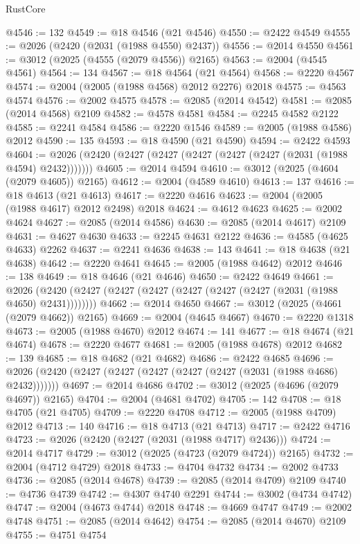\begin{lexlean}{RustCore}
\begin{coremodule}
@4546 := 132
@4549 := @18 @4546 (@21 @4546)
@4550 := @2422 @4549
@4555 := @2026 (@2420 (@2031 (@1988 @4550) @2437))
@4556 := @2014 @4550
@4561 := @3012 (@2025 (@4555 (@2079 @4556)) @2165)
@4563 := @2004 (@4545 @4561)
@4564 := 134
@4567 := @18 @4564 (@21 @4564)
@4568 := @2220 @4567
@4574 := @2004 (@2005 (@1988 @4568) @2012 @2276) @2018
@4575 := @4563 @4574
@4576 := @2002 @4575
@4578 := @2085 (@2014 @4542)
@4581 := @2085 (@2014 @4568) @2109
@4582 := @4578 @4581
@4584 := @2245 @4582 @2122
@4585 := @2241 @4584
@4586 := @2220 @1546
@4589 := @2005 (@1988 @4586) @2012
@4590 := 135
@4593 := @18 @4590 (@21 @4590)
@4594 := @2422 @4593
@4604 := @2026 (@2420 (@2427 (@2427 (@2427 (@2427 (@2427 (@2031 (@1988 @4594) @2432)))))))
@4605 := @2014 @4594
@4610 := @3012 (@2025 (@4604 (@2079 @4605)) @2165)
@4612 := @2004 (@4589 @4610)
@4613 := 137
@4616 := @18 @4613 (@21 @4613)
@4617 := @2220 @4616
@4623 := @2004 (@2005 (@1988 @4617) @2012 @2498) @2018
@4624 := @4612 @4623
@4625 := @2002 @4624
@4627 := @2085 (@2014 @4586)
@4630 := @2085 (@2014 @4617) @2109
@4631 := @4627 @4630
@4633 := @2245 @4631 @2122
@4636 := @4585 (@4625 @4633) @2262
@4637 := @2241 @4636
@4638 := 143
@4641 := @18 @4638 (@21 @4638)
@4642 := @2220 @4641
@4645 := @2005 (@1988 @4642) @2012
@4646 := 138
@4649 := @18 @4646 (@21 @4646)
@4650 := @2422 @4649
@4661 := @2026 (@2420 (@2427 (@2427 (@2427 (@2427 (@2427 (@2427 (@2031 (@1988 @4650) @2431))))))))
@4662 := @2014 @4650
@4667 := @3012 (@2025 (@4661 (@2079 @4662)) @2165)
@4669 := @2004 (@4645 @4667)
@4670 := @2220 @1318
@4673 := @2005 (@1988 @4670) @2012
@4674 := 141
@4677 := @18 @4674 (@21 @4674)
@4678 := @2220 @4677
@4681 := @2005 (@1988 @4678) @2012
@4682 := 139
@4685 := @18 @4682 (@21 @4682)
@4686 := @2422 @4685
@4696 := @2026 (@2420 (@2427 (@2427 (@2427 (@2427 (@2427 (@2031 (@1988 @4686) @2432)))))))
@4697 := @2014 @4686
@4702 := @3012 (@2025 (@4696 (@2079 @4697)) @2165)
@4704 := @2004 (@4681 @4702)
@4705 := 142
@4708 := @18 @4705 (@21 @4705)
@4709 := @2220 @4708
@4712 := @2005 (@1988 @4709) @2012
@4713 := 140
@4716 := @18 @4713 (@21 @4713)
@4717 := @2422 @4716
@4723 := @2026 (@2420 (@2427 (@2031 (@1988 @4717) @2436)))
@4724 := @2014 @4717
@4729 := @3012 (@2025 (@4723 (@2079 @4724)) @2165)
@4732 := @2004 (@4712 @4729) @2018
@4733 := @4704 @4732
@4734 := @2002 @4733
@4736 := @2085 (@2014 @4678)
@4739 := @2085 (@2014 @4709) @2109
@4740 := @4736 @4739
@4742 := @4307 @4740 @2291
@4744 := @3002 (@4734 @4742)
@4747 := @2004 (@4673 @4744) @2018
@4748 := @4669 @4747
@4749 := @2002 @4748
@4751 := @2085 (@2014 @4642)
@4754 := @2085 (@2014 @4670) @2109
@4755 := @4751 @4754

\end{coremodule}
\end{lexlean}
